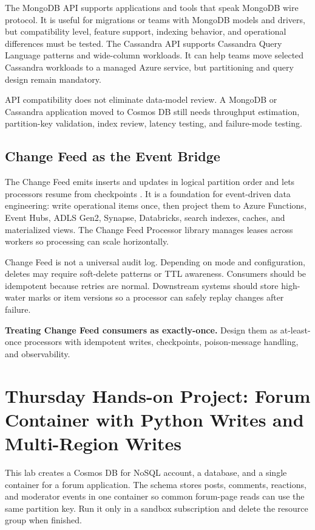 The MongoDB API supports applications and tools that speak MongoDB wire protocol. It is useful for migrations or teams with MongoDB models and drivers, but compatibility level, feature support, indexing behavior, and operational differences must be tested. The Cassandra API supports Cassandra Query Language patterns and wide-column workloads. It can help teams move selected Cassandra workloads to a managed Azure service, but partitioning and query design remain mandatory.

\begin{notebox}
API compatibility does not eliminate data-model review. A MongoDB or Cassandra application moved to Cosmos DB still needs throughput estimation, partition-key validation, index review, latency testing, and failure-mode testing.
\end{notebox}

\subsection{Change Feed as the Event Bridge}
The Change Feed emits inserts and updates in logical partition order and lets processors resume from checkpoints \cite{microsoft2025cosmosChangeFeed}. It is a foundation for event-driven data engineering: write operational items once, then project them to Azure Functions, Event Hubs, ADLS Gen2, Synapse, Databricks, search indexes, caches, and materialized views. The Change Feed Processor library manages leases across workers so processing can scale horizontally.

Change Feed is not a universal audit log. Depending on mode and configuration, deletes may require soft-delete patterns or TTL awareness. Consumers should be idempotent because retries are normal. Downstream systems should store high-water marks or item versions so a processor can safely replay changes after failure.

\begin{pitfall}
\textbf{Treating Change Feed consumers as exactly-once.} Design them as at-least-once processors with idempotent writes, checkpoints, poison-message handling, and observability.
\end{pitfall}

\section{Thursday Hands-on Project: Forum Container with Python Writes and Multi-Region Writes}
This lab creates a Cosmos DB for NoSQL account, a database, and a single container for a forum application. The schema stores posts, comments, reactions, and moderator events in one container so common forum-page reads can use the same partition key. Run it only in a sandbox subscription and delete the resource group when finished.

